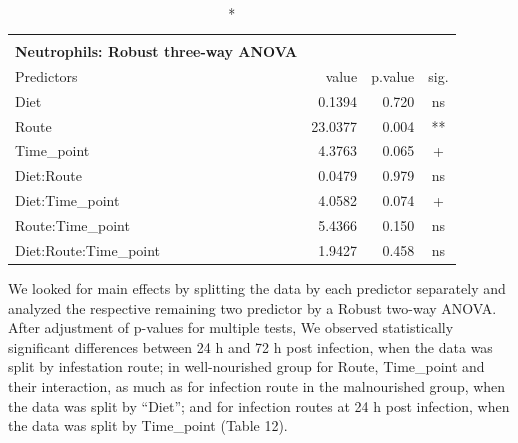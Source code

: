 \documentclass[
  12pt,
  letterpaper,
]{article}
\begin{document}
\begin{longtable}{l|rrc}
\caption*{
{\large \textbf{Appendix Table 11}} \\ 
{\small \textbf{Neutrophils: Robust three-way ANOVA}}
} \\ 
\toprule
\multicolumn{1}{l}{Predictors} & value & p.value & sig. \\ 
\midrule\addlinespace[2.5pt]
Diet & 0.1394 & 0.720 & ns \\ 
Route & 23.0377 & 0.004 & ** \\ 
Time\_point & 4.3763 & 0.065 & + \\ 
Diet:Route & 0.0479 & 0.979 & ns \\ 
Diet:Time\_point & 4.0582 & 0.074 & + \\ 
Route:Time\_point & 5.4366 & 0.150 & ns \\ 
Diet:Route:Time\_point & 1.9427 & 0.458 & ns \\ 
\bottomrule
\end{longtable}

We looked for main effects by splitting the data by each predictor separately and analyzed the respective remaining two predictor by a Robust two-way ANOVA. After adjustment of p-values for multiple tests, We observed statistically significant differences between 24 h and 72 h post infection, when the data was split by infestation route; in well-nourished group for Route, Time\_point and their interaction, as much as for infection route in the malnourished group, when the data was split by ``Diet''; and for infection routes at 24 h post infection, when the data was split by Time\_point (Table 12).
\end{document}
